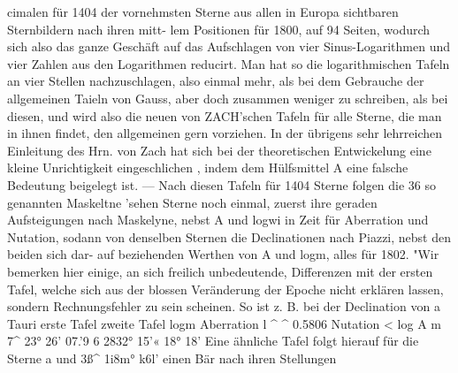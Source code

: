 \documentclass[12pt,a4paper]{article}
\begin{document}
cimalen für 1404 der vornehmsten Sterne aus allen in Europa sichtbaren Sternbildern nach ihren mitt-\newline
lem Positionen für 1800, auf 94 Seiten, wodurch sich also das ganze Geschäft auf das Aufschlagen von\newline
vier Sinus-Logarithmen und vier Zahlen aus den Logarithmen reducirt. Man hat so die logarithmischen\newline
Tafeln an vier Stellen nachzuschlagen, also einmal mehr, als bei dem Gebrauche der allgemeinen Taieln\newline
von Gauss, aber doch zusammen weniger zu schreiben, als bei diesen, und wird also die neuen von\newline
ZACH'schen Tafeln für alle Sterne, die man in ihnen findet, den allgemeinen gern vorziehen. In der\newline
übrigens sehr lehrreichen Einleitung des Hrn. von Zach hat sich bei der theoretischen Entwickelung\newline
eine kleine Unrichtigkeit eingeschlichen , indem dem Hülfsmittel A eine falsche Bedeutung beigelegt\newline
ist. --- Nach diesen Tafeln für 1404 Sterne folgen die 36 so genannten Maskeltne 'sehen Sterne noch\newline
einmal, zuerst ihre geraden Aufsteigungen nach Maskelyne, nebst A und logwi in Zeit für Aberration\newline
und Nutation, sodann von denselben Sternen die Declinationen nach Piazzi, nebst den beiden sich dar-\newline
auf beziehenden Werthen von A und logm, alles für 1802. "Wir bemerken hier einige, an sich freilich\newline
unbedeutende, Differenzen mit der ersten Tafel, welche sich aus der blossen Veränderung der Epoche\newline
nicht erklären lassen, sondern Rechnungsfehler zu sein scheinen. So ist z. B. bei der Declination von\newline
a Tauri\newline
erste Tafel zweite Tafel\newline
logm\newline
Aberration l \^{} \^{} 0.5806\newline
Nutation < log A m 7\^{} 23° 26' 07.'9 6 2832° 15'« 18° 18'\newline
Eine ähnliche Tafel folgt hierauf für die Sterne a und 3ß\^{} 1i8m° k6l' einen Bär nach ihren Stellungen\newline
\end{document}
